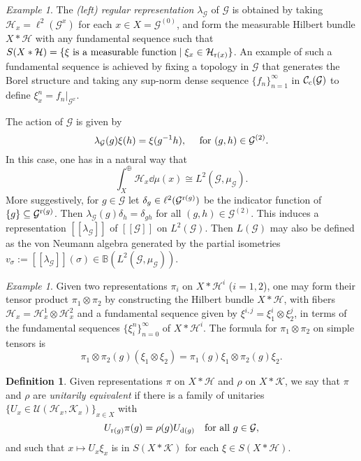 \documentclass[a4paper,11pt]{article}
\numberwithin{equation}{section}
\theoremstyle{definition}
\newtheorem{defn}[thm]{Definition}
\theoremstyle{remark}
\newtheorem{ex}[thm]{Example}
\numberwithin{equation}{section}
\newcommand{\rG}{\mathcal{G}}
\def\H{\mathcal H}
\def\K{\mathcal K}
\newcommand{\U}{\mathcal{U}}
\def\sub{\subseteq}
\def\r{{\rm r}}
\def\d{{\rm d}}
\numberwithin{equation}{section}
\begin{document}
\begin{ex} \label{leftreg}
The {\it (left) regular representation} $\lambda_\rG$ of $\rG$ is obtained by taking $\H_x = \ell^2(\rG^x)$ for each $x \in X=\rG^{(0)}$, and form the measurable Hilbert bundle $X \ast \H$ with any fundamental sequence such that $S(X \ast \H)=\{\xi\textup{ is a measurable function}\mid \xi_x\in \H_{\r(x)}\}$. An example of such a fundamental sequence is achieved by fixing a topology in $\rG$ that generates the Borel structure and taking any sup-norm dense sequence $\{f_n\}_{n=1}^\infty$ in $\mathcal C_{\rm c}(\rG)$ to define $\xi_x^n=f_n|_{\rG^x}$.

The action of $\rG$ is given by 
$$
\lambda_\rG(g)\xi(h)=\xi(g^{-1}h),\quad\textup{ for } (g,h)\in\rG^{(2)}. 
$$  In this case, one has in a natural way that $$
\int_X^\oplus \H_x\dd \mu(x)\cong L^2(\rG,\mu_\rG). 
$$ 
More suggestively, for $ g\in \rG $ let $ \delta_{g}\in \ell^{2}(\rG^{\r(g)}) $ be the indicator function of $ \{g\}\sub \rG^{\r(g)}$. Then $ \lambda_\rG(g) \delta_{h} = \delta_{gh} $ for all $ (g,h)\in \rG^{(2)} $. This induces a representation $ [[\lambda_\rG]] $ of $ [[\rG]] $ on $ L^{2}(\rG) $. Then $ L(\rG) $ may also be defined as the von Neumann algebra generated by the partial isometries $ v_{\sigma} := [[\lambda_\rG]](\sigma)\in \mathbb B(L^{2}(\rG,\mu_\rG)) $.
\end{ex}

\begin{ex}\label{tensors}
    Given two representations $\pi_i$ on $X \ast \H^i$ ($i=1,2$), one may form their tensor product $\pi_1\otimes\pi_2$ by constructing the Hilbert bundle $X \ast \H$, with fibers $\H_x=\H_x^1\otimes \H_x^2$ and a fundamental sequence given by $\xi^{i,j}=\xi^i_1\otimes \xi_2^j$, in terms of the fundamental sequences $\{\xi_i^n\}_{n=0}^\infty$ of $X\ast \H^i$. The formula for $\pi_1\otimes\pi_2$ on simple tensors is $$\pi_1\otimes\pi_2(g)(\xi_1\otimes\xi_2)=\pi_1(g)\xi_1\otimes\pi_2(g)\xi_2.$$
\end{ex}


\begin{defn} \label{equiv}
Given representations $\pi$ on $X \ast \H$ and $\rho$ on $X \ast \K$, we say that $\pi$ and $\rho$ are {\it unitarily equivalent} if there is a family of unitaries $\{U_x \in \U(\H_x, \K_x)\}_{x \in X}$ with 
$$
U_{\r(g)}\pi(g) = \rho(g)U_{\d(g)} \quad \text{for all }g \in \rG,
$$
and such that $x \mapsto U_x\xi_x$ is in $S(X \ast \K)$ for each $\xi \in S(X \ast \H)$. 
\end{defn}
\end{document}
